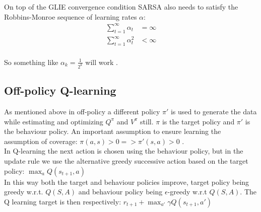On top of the GLIE convergence condition SARSA also needs
to satisfy the Robbins-Monroe sequence of learning rates $\alpha$: 
\begin{align*}
    \sum^{\infty}_{t=1} \alpha_{t} &= \infty \\
    \sum^{\infty}_{t=1} \alpha_{t}^{2} & < \infty \\
\end{align*}

So something like $\alpha_{k} = \frac{1}{2^{k}}$ will 
work \cite{lecture_mfc}.


\subsection{Off-policy Q-learning}

As mentioned above in off-policy a different policy  $\pi'$ is used to generate the data while estimating and optimizing $Q^{\pi}$ and $V^{\pi}$ still. $\pi$ is the target policy and $\pi'$ is the  behaviour policy. An important assumption to ensure learning the assumption of coverage: $\pi(a, s) > 0 => \pi'(s, a) > 0$ \cite{lecture_mfc}.\\


In Q-learning the  next action is chosen using the behaviour policy, but in the update rule we use the alternative greedy successive action based on the target policy: $\max_a Q(s_{t+1}, a)$\\

In this way both the target and behaviour policies improve, target policy being greedy w.r.t. $Q(S, A)$ and behaviour policy being $\epsilon$-greedy w.r.t $Q(S, A)$. The Q learning target is then respectively: $r_{t+1} + \max_{a'} \gamma Q(s_{t+1}, a')$\\


